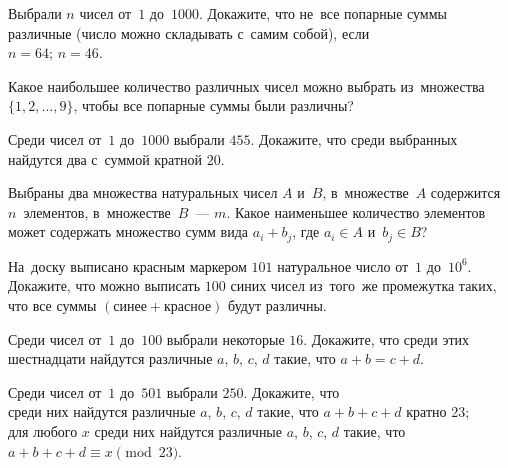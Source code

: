 


\begin{problems}

\item
Выбрали $n$ чисел от~$1$ до~$1000$.
Докажите, что не~все попарные суммы различные (число можно складывать с~самим
собой), если
\\
\subproblem $n = 64$;
\qquad
\subproblem $n = 46$.

\item
Какое наибольшее количество различных чисел можно выбрать из~множества
$\{ 1, 2, \ldots, 9 \}$, чтобы все попарные суммы были различны?

\item
Среди чисел от~$1$ до~$1000$ выбрали $455$.
Докажите, что среди выбранных найдутся два с~суммой кратной $20$.

\item
Выбраны два множества натуральных чисел $A$ и~$B$, в~множестве~$A$ содержится
$n$~элементов, в~множестве~$B$~--- $m$.
Какое наименьшее количество элементов может содержать множество сумм вида
$a_{i} + b_{j}$, где $a_{i} \in A$ и~$b_{j} \in B$?

\item
На~доску выписано красным маркером $101$ натуральное число от~$1$ до~$10^6$.
Докажите, что можно выписать $100$ синих чисел из~того~же промежутка таких, что
все суммы $(\text{синее} + \text{красное})$ будут различны.

\item
Среди чисел от~$1$ до~$100$ выбрали некоторые $16$.
Докажите, что среди этих шестнадцати найдутся различные $a$, $b$, $c$, $d$
такие, что $a + b = c + d$.

\item
Среди чисел от~$1$ до~$501$ выбрали $250$.
Докажите, что
\\
\subproblem
среди них найдутся различные $a$, $b$, $c$, $d$ такие, что $a + b + c + d$
кратно $23$;
\\
\subproblem
для любого $x$ среди них найдутся различные $a$, $b$, $c$, $d$ такие, что
$a + b + c + d \equiv x \pmod{23}$.

\end{problems}

